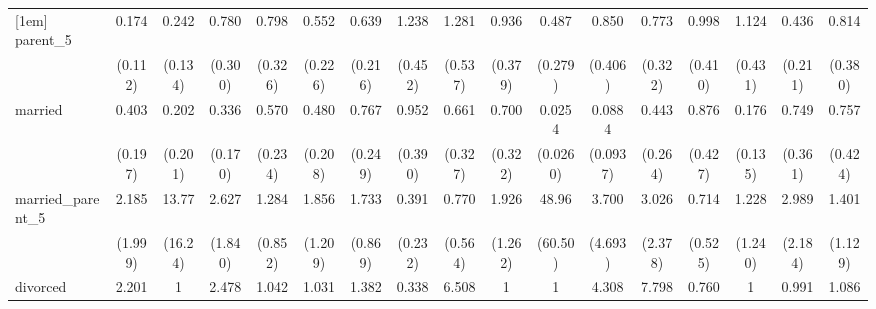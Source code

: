 {\begin{tabular}{l*{16}{c}}
[1em]
parent\_5            &       0.174\sym{**} &       0.242\sym{*}  &       0.780         &       0.798         &       0.552         &       0.639         &       1.238         &       1.281         &       0.936         &       0.487         &       0.850         &       0.773         &       0.998         &       1.124         &       0.436         &       0.814         \\
                    &     (0.112)         &     (0.134)         &     (0.300)         &     (0.326)         &     (0.226)         &     (0.216)         &     (0.452)         &     (0.537)         &     (0.379)         &     (0.279)         &     (0.406)         &     (0.322)         &     (0.410)         &     (0.431)         &     (0.211)         &     (0.380)         \\
[1em]
married             &       0.403         &       0.202         &       0.336\sym{*}  &       0.570         &       0.480         &       0.767         &       0.952         &       0.661         &       0.700         &      0.0254\sym{***}&      0.0884\sym{*}  &       0.443         &       0.876         &       0.176\sym{*}  &       0.749         &       0.757         \\
                    &     (0.197)         &     (0.201)         &     (0.170)         &     (0.234)         &     (0.208)         &     (0.249)         &     (0.390)         &     (0.327)         &     (0.322)         &    (0.0260)         &    (0.0937)         &     (0.264)         &     (0.427)         &     (0.135)         &     (0.361)         &     (0.424)         \\
[1em]
married\_parent\_5    &       2.185         &       13.77\sym{*}  &       2.627         &       1.284         &       1.856         &       1.733         &       0.391         &       0.770         &       1.926         &       48.96\sym{**} &       3.700         &       3.026         &       0.714         &       1.228         &       2.989         &       1.401         \\
                    &     (1.999)         &     (16.24)         &     (1.840)         &     (0.852)         &     (1.209)         &     (0.869)         &     (0.232)         &     (0.564)         &     (1.262)         &     (60.50)         &     (4.693)         &     (2.378)         &     (0.525)         &     (1.240)         &     (2.184)         &     (1.129)         \\
[1em]
divorced            &       2.201         &           1         &       2.478         &       1.042         &       1.031         &       1.382         &       0.338         &       6.508\sym{***}&           1         &           1         &       4.308\sym{*}  &       7.798\sym{**} &       0.760         &           1         &       0.991         &       1.086         \\

\end{tabular}}
